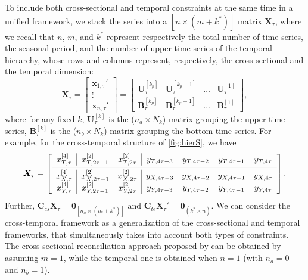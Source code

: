 \documentclass[a4paper,11pt]{article}
\newcommand{\xvet}{\bm{x}}
\newcommand{\Bvet}{\bm{B}}
\newcommand{\Cvet}{\bm{C}}
\newcommand{\Uvet}{\bm{U}}
\newcommand{\Xvet}{\bm{X}}
\newcommand{\Zerovet}{\bm{0}}
\theoremstyle{definition}
\begin{document}
To include both cross-sectional and temporal constraints at the same time in a unified framework, we stack the series into a $[n \times (m+k^\ast)]$ matrix $\Xvet_\tau$, where we recall that $n$, $m$, and $k^*$ represent respectively the total number of time series, the seasonal period, and the number of upper time series of the temporal hierarchy, whose rows and columns represent, respectively, the cross-sectional and the temporal dimension:
$$
	\Xvet_\tau = \begin{bmatrix}
		\xvet_{1,\tau}' \\[-0.1cm]
		\vdots          \\[-0.2cm]
		\xvet_{n,\tau}'
	\end{bmatrix} = \begin{bmatrix}
	\Uvet_{\tau}^{[k_p]} & \Uvet_{\tau}^{[k_p-1]} & \dots & \Uvet_{\tau}^{[1]}\\[0.25cm]
	\Bvet_{\tau}^{[k_p]} & \Bvet_{\tau}^{[k_p-1]} & \dots & \Bvet_{\tau}^{[1]}
	\end{bmatrix},
$$
where for any fixed $k$,
$\Uvet_{\tau}^{[k]}$ is the ($n_a\times N_k$) matrix grouping the upper time series, $\Bvet_{\tau}^{[k]}$ is the ($n_b\times N_k$) matrix grouping the bottom time series. For example, for the cross-temporal structure of \autoref{fig:hierS}, we have
$$
\Xvet_\tau = \left[\begin{array}{c|cc|cccc}
x^{[4]}_{T,\tau} & x^{[2]}_{T,2\tau-1} & x^{[2]}_{T,2\tau} & y_{T,4\tau-3} & y_{T,4\tau-2} & y_{T,4\tau-1} & y_{T,4\tau}\\
\midrule
x^{[4]}_{X,\tau} & x^{[2]}_{X,2\tau-1} & x^{[2]}_{X,2\tau} & y_{X,4\tau-3} & y_{X,4\tau-2} & y_{X,4\tau-1} & y_{X,4\tau}\\
x^{[4]}_{Y,\tau} & x^{[2]}_{Y,2\tau-1} & x^{[2]}_{Y,2\tau} & y_{Y,4\tau-3} & y_{Y,4\tau-2} & y_{Y,4\tau-1} & y_{Y,4\tau}\\
\end{array}\right].
$$
Further, $\Cvet_{cs}\Xvet_\tau = \Zerovet_{\left[n_a \times (m+k^\ast)\right]}$ and $\Cvet_{te}\Xvet_\tau' = \Zerovet_{(k^\ast \times n)} $. We can consider the cross-temporal framework as a generalization of the cross-sectional and temporal frameworks, that simultaneously takes into account both types of constraints. The cross-sectional reconciliation approach proposed by \cite{hyndman2011} can be obtained by assuming $m = 1$, while the temporal one \citep{athanasopoulos2017} is obtained when $n = 1$ (with $n_a = 0$ and $n_b = 1$).


\end{document}
